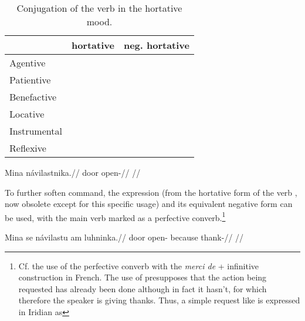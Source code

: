 \begin{table}
    \footnotesize\sffamily
		\caption{Conjugation of the verb  in the hortative mood.}
		\label{tbl:hortative}
    \begin{tabu}to 0.7\textwidth{YYY}
         \toprule

         &{\sc hortative}&{\sc neg. hortative}  \\
         \midrule
         Agentive &
          &
         \\

         Patientive &
          &
         \\

         Benefactive &
          &
         \\

         Locative &
          &
         \\

         Instrumental &
          &
         \\

         Reflexive &
          &
         \\

         \bottomrule
    \end{tabu}

\end{table}

\pex
\begingl
\gla Mina návilastnika.//
\glb door open-//
\glft {}//
\endgl
\xe

To further soften command, the expression  (from the hortative
form of the verb , now obsolete except for this
specific usage) and its equivalent negative form  can be used,
with the main verb marked as a perfective converb.\footnote{Cf. the use of the perfective converb with the \textit{merci de} + infinitive construction in French. The use of  presupposes that the action being requested has already been done although in fact it hasn't, for which therefore the speaker is giving thanks. Thus, a simple request like  is expressed in Iridian as }

\pex
\begingl
\gla Mina se návilastu am luhninka.//
\glb door \Refl{} open- because thank-//
\glft {}//
\endgl
\xe

